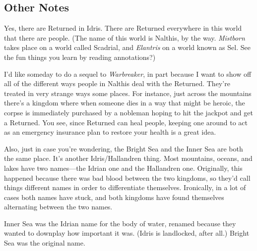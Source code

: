 \subsection*{Other Notes}

Yes, there are Returned in Idris. There are Returned everywhere in this world that there are people. (The name of this world is Nalthis, by the way. \textit{Mistborn} takes place on a world called Scadrial, and \textit{Elantris} on a world known as Sel. See the fun things you learn by reading annotations?)

I’d like someday to do a sequel to \textit{Warbreaker}, in part because I want to show off all of the different ways people in Nalthis deal with the Returned. They’re treated in very strange ways some places. For instance, just across the mountains there’s a kingdom where when someone dies in a way that might be heroic, the corpse is immediately purchased by a nobleman hoping to hit the jackpot and get a Returned. You see, since Returned can heal people, keeping one around to act as an emergency insurance plan to restore your health is a great idea.

Also, just in case you’re wondering, the Bright Sea and the Inner Sea are both the same place. It’s another Idris/Hallandren thing. Most mountains, oceans, and lakes have two names—the Idrian one and the Hallandren one. Originally, this happened because there was bad blood between the two kingdoms, so they’d call things different names in order to differentiate themselves. Ironically, in a lot of cases both names have stuck, and both kingdoms have found themselves alternating between the two names.

Inner Sea was the Idrian name for the body of water, renamed because they wanted to downplay how important it was. (Idris is landlocked, after all.) Bright Sea was the original name.




